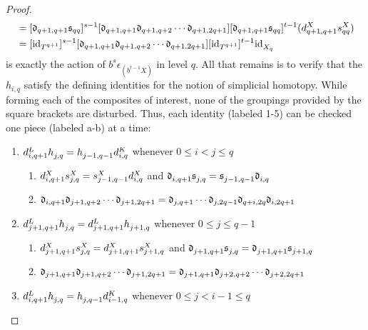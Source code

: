 \documentclass[10pt]{article}
\newcommand{\trip}[3]{{#1}_{\smash{#2}}^{\smash{#3}}}
\begin{document}
\begin{iteratedBarConstructions}
\begin{proof}
\begin{alignat*}{2}
&=
[\frakd_{q+1,q+1}\fraks_{qq}]^{s-1}[\frakd_{q+1,q+1}\frakd_{q+1,q+2}\circ\cdots \circ\frakd_{q+1,2q+1}][\frakd_{q+1,q+1}\fraks_{qq}]^{t-1}(\trip{d}{q+1,q+1}{X}\trip{s}{qq}{X})
\\
&=
[\trip{\textup{id}}{T^{q+1}}{}]^{s-1}[\frakd_{q+1,q+1}\frakd_{q+1,q+2}\circ\cdots \circ\frakd_{q+1,2q+1}][\trip{\textup{id}}{T^{q+1}}{}]^{t-1}\trip{\textup{id}}{X_q}{}%
\end{alignat*}
is exactly the action of $b^{s}\epsilon_{(b^{t-1}X)}$ in level $q$.
All that remains is to verify that the $h_{i,q}$ satisfy the defining identities for the notion of simplicial homotopy. While forming each of the composites of interest, none of the groupings provided by the square brackets are disturbed. Thus, each identity (labeled 1-5) can be checked one piece (labeled a-b) at a time:
{\renewcommand{\circ}{\relax}
\begin{enumerate}\squishlist
\setlength{\parindent}{.25in}
\item $\trip{d}{i,q+1}{L}\circ \trip{h}{j,q}{}=\trip{h}{j-1,q-1}{}\circ \trip{d}{i,q}{K}$ whenever $0\leq i<j\leq q$
\begin{enumerate}\squishlist
\setlength{\parindent}{.25in}
\item $\trip{d}{i,q+1}{X}\circ \trip{s}{j,q}{X}=\trip{s}{j-1,q-1}{X}\circ \trip{d}{i,q}{X}$ and $\trip{\frakd}{i,q+1}{}\circ \trip{\fraks}{j,q}{}=\trip{\fraks}{j-1,q-1}{}\circ \trip{\frakd}{i,q}{}$
\item 
$\frakd_{i,q+1}\circ
\frakd_{j+1,q+2}\circ\cdots \circ\frakd_{j+1,2q+1}=
\frakd_{j,q+1}\circ\cdots \circ\frakd_{j,2q-1}\circ
\frakd_{q+i,2q}\circ\frakd_{i,2q+1}$
\end{enumerate}
\item $\trip{d}{j+1,q+1}{L}\circ \trip{h}{j,q}{}=\trip{d}{j+1,q+1}{L}\circ \trip{h}{j+1,q}{}$ whenever $0\leq j\leq q-1$
\begin{enumerate}\squishlist
\setlength{\parindent}{.25in}
\item $\trip{d}{j+1,q+1}{X}\circ \trip{s}{j,q}{X}=\trip{d}{j+1,q+1}{X}\circ \trip{s}{j+1,q}{X}$ and $\trip{\frakd}{j+1,q+1}{}\circ \trip{\fraks}{j,q}{}=\trip{\frakd}{j+1,q+1}{}\circ \trip{\fraks}{j+1,q}{}$
\item 
$\frakd_{j+1,q+1}\circ
\frakd_{j+1,q+2}\circ\cdots \circ\frakd_{j+1,2q+1}=
\frakd_{j+1,q+1}\circ
\frakd_{j+2,q+2}\circ\cdots \circ\frakd_{j+2,2q+1}$
\end{enumerate}
\item $\trip{d}{i,q+1}{L}\circ \trip{h}{j,q}{}=\trip{h}{j,q-1}{}\circ \trip{d}{i-1,q}{K}$ whenever $0\leq j<i-1\leq q$

\end{enumerate}}
\end{proof}
\end{iteratedBarConstructions}
\end{document}
